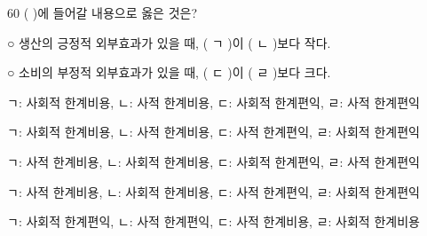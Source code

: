 \begin{question}{60}
( )에 들어갈 내용으로 옳은 것은?
\begin{framedtext}
○ 생산의 긍정적 외부효과가 있을 때, ( ㄱ )이 ( ㄴ )보다 작다. \par
○ 소비의 부정적 외부효과가 있을 때, ( ㄷ )이 ( ㄹ )보다 크다. \par
\end{framedtext}
\begin{choices}
  \item ㄱ: 사회적 한계비용, ㄴ: 사적 한계비용, ㄷ: 사회적 한계편익, ㄹ: 사적 한계편익
  \item ㄱ: 사회적 한계비용, ㄴ: 사적 한계비용, ㄷ: 사적 한계편익, ㄹ: 사회적 한계편익
  \item ㄱ: 사적 한계비용, ㄴ: 사회적 한계비용, ㄷ: 사회적 한계편익, ㄹ: 사적 한계편익
  \item ㄱ: 사적 한계비용, ㄴ: 사회적 한계비용, ㄷ: 사적 한계편익, ㄹ: 사회적 한계편익
  \item ㄱ: 사회적 한계편익, ㄴ: 사적 한계편익, ㄷ: 사적 한계비용, ㄹ: 사회적 한계비용
\end{choices}
\end{question}
